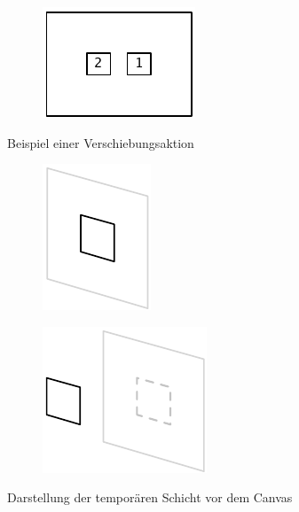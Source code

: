 \begin{figure}[hbt]
\begin{subfigure}{\subfigurewidth}
        \caption{}
        \label{fig:movement-action-example-d}
    \end{subfigure}
    \begin{subfigure}{\subfigurewidth}
        \centering
        \includegraphics[scale=\graphicsscale]{resources/movement-action-example-e}
        \caption{}
        \label{fig:movement-action-example-e}
    \end{subfigure}
    \caption{Beispiel einer Verschiebungsaktion}
    \label{fig:movement-action-example}
\end{figure}

\begin{figure}[hbt]
    \newcommand{\subfigurewidth}{0.35\textwidth}
    \newcommand{\graphicsscale}{1.2}
    \centering
    \begin{subfigure}{\subfigurewidth}
        \centering
        \includegraphics[scale=\graphicsscale]{resources/temporary-layer-visualization-a}
        \caption{}
    \end{subfigure}
    \begin{subfigure}{\subfigurewidth}
        \centering
        \includegraphics[scale=\graphicsscale]{resources/temporary-layer-visualization-b}
        \caption{}
    \end{subfigure}
    \caption{Darstellung der temporären Schicht vor dem Canvas}
    \label{fig:temporary-layer-visualization}
\end{figure}

